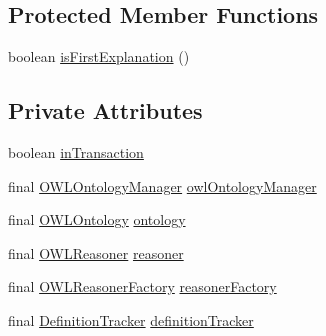 \subsection*{Protected Member Functions}
\begin{DoxyCompactItemize}
\item 
boolean \hyperlink{classcom_1_1clarkparsia_1_1owlapi_1_1explanation_1_1_single_explanation_generator_impl_a930a5f906d8fb0608ce29ef6525ced08}{is\-First\-Explanation} ()
\end{DoxyCompactItemize}
\subsection*{Private Attributes}
\begin{DoxyCompactItemize}
\item 
boolean \hyperlink{classcom_1_1clarkparsia_1_1owlapi_1_1explanation_1_1_single_explanation_generator_impl_aca023e2dbefd7739b6ddef1f7606449e}{in\-Transaction}
\item 
final \hyperlink{interfaceorg_1_1semanticweb_1_1owlapi_1_1model_1_1_o_w_l_ontology_manager}{O\-W\-L\-Ontology\-Manager} \hyperlink{classcom_1_1clarkparsia_1_1owlapi_1_1explanation_1_1_single_explanation_generator_impl_ace73d6bc5aa2ea551dde86ff85fef61b}{owl\-Ontology\-Manager}
\item 
final \hyperlink{interfaceorg_1_1semanticweb_1_1owlapi_1_1model_1_1_o_w_l_ontology}{O\-W\-L\-Ontology} \hyperlink{classcom_1_1clarkparsia_1_1owlapi_1_1explanation_1_1_single_explanation_generator_impl_ac4bb20805a66ec91e52ae4dc7d3dd6d4}{ontology}
\item 
final \hyperlink{interfaceorg_1_1semanticweb_1_1owlapi_1_1reasoner_1_1_o_w_l_reasoner}{O\-W\-L\-Reasoner} \hyperlink{classcom_1_1clarkparsia_1_1owlapi_1_1explanation_1_1_single_explanation_generator_impl_a9df949455124847c9685dc24a31f225b}{reasoner}
\item 
final \hyperlink{interfaceorg_1_1semanticweb_1_1owlapi_1_1reasoner_1_1_o_w_l_reasoner_factory}{O\-W\-L\-Reasoner\-Factory} \hyperlink{classcom_1_1clarkparsia_1_1owlapi_1_1explanation_1_1_single_explanation_generator_impl_a2eacc90779bb1e8895675560a1d3b57a}{reasoner\-Factory}
\item 
final \hyperlink{classcom_1_1clarkparsia_1_1owlapi_1_1explanation_1_1util_1_1_definition_tracker}{Definition\-Tracker} \hyperlink{classcom_1_1clarkparsia_1_1owlapi_1_1explanation_1_1_single_explanation_generator_impl_a1bf19aa87bbbecc847194238754ba300}{definition\-Tracker}
\end{DoxyCompactItemize}


